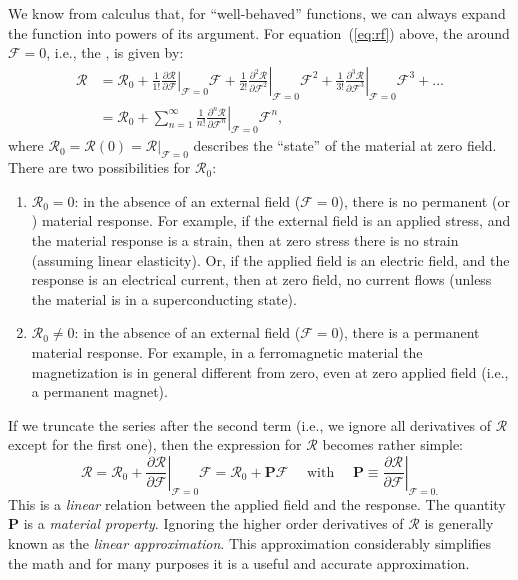 We know from calculus that, for ``well-behaved'' functions, we can always expand the function into powers of its argument. For equation~(\ref{eq:rf}) above, the  around $\mathcal{F}=0$, i.e., the , is given by:
\begin{align}
	\mathcal{R}&=\mathcal{R}_0 + 
	\frac{1}{1!}\left.\frac{\partial\mathcal{R}}{\partial\mathcal{F}}\right 
	\vert_{\mathcal{F}=0}\!\!\!\!\mathcal{F} + 
	\frac{1}{2!}\left.\frac{\partial^2\mathcal{R}}{\partial\mathcal{F}^2}\right 
	\vert_{\mathcal{F}=0}\!\!\!\!\mathcal{F}^2 + 
	\frac{1}{3!}\left.\frac{\partial^3\mathcal{R}}{\partial\mathcal{F}^3}\right 
	\vert_{\mathcal{F}=0}\!\!\!\!\mathcal{F}^3 + \ldots \nonumber\\
	&= \mathcal{R}_0 +
	\sum_{n=1}^{\infty}\frac{1}{n!}\left.\frac{\partial^n\mathcal{R}}{\partial\mathcal{F}^n}\right 
	\vert_{\mathcal{F}=0}\!\!\!\!\mathcal{F}^n,
	\label{eq:expansion}
\end{align}
where $\mathcal{R}_0 = \mathcal{R}(0)=\mathcal{R}\vert_{\mathcal{F}=0}$ describes the ``state'' of the material at zero field.  There are two possibilities for $\mathcal{R}_0$:
\begin{enumerate}
	\item $\mathcal{R}_0=0$: in the absence of an external field ($\mathcal{F}=0$), there is no permanent (or ) material response.  For example, if the external field is an applied stress, and the material response is a strain, then at zero stress there is no strain (assuming linear elasticity).  Or, if the applied field is an electric field, and the response is an electrical current, then at zero field, no current flows (unless the material is in a superconducting state).
	
	\item $\mathcal{R}_0\neq 0$: in the absence of an external field ($\mathcal{F}=0$), there is a permanent material response.  For example, in a ferromagnetic material the magnetization is in general different from zero, even at zero applied field (i.e., a permanent magnet).  
\end{enumerate}

If we truncate the series after the second term (i.e., we ignore all derivatives of $\mathcal{R}$ except for the first one), then the expression for $\mathcal{R}$ becomes rather simple:
\begin{equation}
	\mathcal{R}=\mathcal{R}_0 + 
	\left.\frac{\partial\mathcal{R}}{\partial\mathcal{F}}\right 
	\vert_{\mathcal{F}=0}\!\!\!\!\mathcal{F} =\mathcal{R}_0 + 
	\mathbf{P}\mathcal{F}\quad\mbox{ with }\quad \mathbf{P}\equiv\left.  
	\frac{\partial\mathcal{R}}{\partial\mathcal{F}}\right\vert_{\mathcal{F}=0.
	}
\end{equation}
This is a \textit{linear} relation between the applied field and the response.  The quantity $\mathbf{P}$ is a \textit{material property}.  Ignoring the higher order derivatives of $\mathcal{R}$ is generally known as the \textit{linear approximation}.  This approximation considerably simplifies the math and for many purposes it is a useful and accurate approximation.

